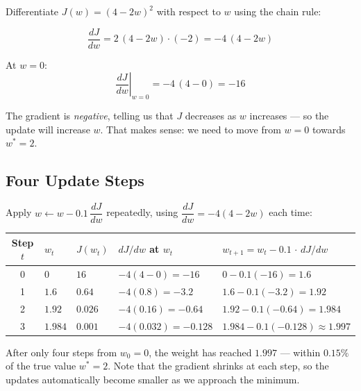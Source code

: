 \documentclass[12pt, a4paper]{article}
\newif\ifstudentmode
\newcommand{\sol}[2][6cm]{%
  \ifstudentmode
    \underline{\hspace{#1}}%
  \else
    {#2}%
  \fi
}
\theoremstyle{definition}
\begin{document}
Differentiate $J(w) = (4 - 2w)^{2}$ with respect to $w$ using the chain rule:

\[
  \frac{dJ}{dw}
  = 2\,(4 - 2w)\cdot(-2)
  = \sol[5cm]{-4\,(4 - 2w)}
\]

At $w = 0$:
\[
  \left.\frac{dJ}{dw}\right|_{w=0}
  = -4\,(4 - 0)
  = \sol[3cm]{-16}
\]

The gradient is \emph{negative}, telling us that $J$ decreases as $w$
increases --- so the update will increase $w$.  That makes sense: we need to
move from $w=0$ towards $w^{*}=2$.

\subsection{Four Update Steps}

Apply $w \leftarrow w - 0.1\,\dfrac{dJ}{dw}$ repeatedly, using
$\dfrac{dJ}{dw} = -4(4-2w)$ each time:

\vspace{0.5em}
\begin{center}
\renewcommand{\arraystretch}{2.0}
\begin{tabular}{c >{\centering}p{1.4cm} >{\centering}p{2.2cm}
                  >{\centering}p{4.0cm} p{4.0cm}}
\toprule
Step $t$ & $w_t$ & $J(w_t)$ & $dJ/dw$ at $w_t$
         & $w_{t+1} = w_t - 0.1\,\cdot\,dJ/dw$ \\
\midrule
0 & $0$     & \sol[1.6cm]{$16$}    & \sol[3.0cm]{$-4(4-0)=-16$}      & \sol[3.5cm]{$0-0.1(-16)=1.6$} \\
1 & $1.6$   & \sol[1.6cm]{$0.64$}  & \sol[3.0cm]{$-4(0.8)=-3.2$}     & \sol[3.5cm]{$1.6-0.1(-3.2)=1.92$} \\
2 & $1.92$  & \sol[1.6cm]{$0.026$} & \sol[3.0cm]{$-4(0.16)=-0.64$}   & \sol[3.5cm]{$1.92-0.1(-0.64)=1.984$} \\
3 & $1.984$ & \sol[1.6cm]{$0.001$} & \sol[3.0cm]{$-4(0.032)=-0.128$} & \sol[3.5cm]{$1.984-0.1(-0.128)\approx 1.997$} \\
\bottomrule
\end{tabular}
\end{center}
\vspace{0.5em}

After only four steps from $w_0 = 0$, the weight has reached $1.997$ ---
within $0.15\%$ of the true value $w^{*} = 2$.
Note that the gradient shrinks at each step, so the updates automatically
become smaller as we approach the minimum.

\end{document}
